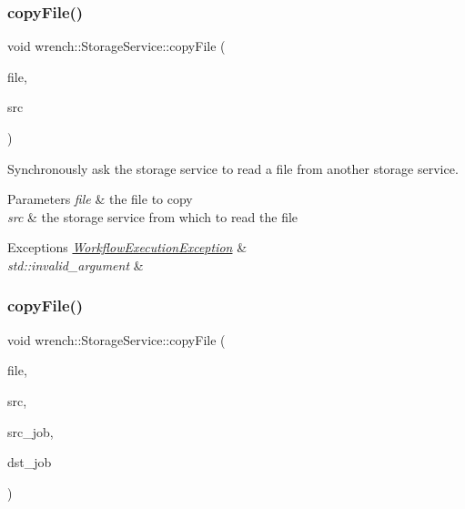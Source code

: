\subsubsection{\texorpdfstring{copy\+File()}{copyFile()}\hspace{0.1cm}{\footnotesize\ttfamily [2/3]}}
{\footnotesize\ttfamily void wrench\+::\+Storage\+Service\+::copy\+File (\begin{DoxyParamCaption}\item[{\hyperlink{classwrench_1_1_workflow_file}{Workflow\+File} $\ast$}]{file,  }\item[{\hyperlink{classwrench_1_1_storage_service}{Storage\+Service} $\ast$}]{src }\end{DoxyParamCaption})\hspace{0.3cm}{\ttfamily [virtual]}}



Synchronously ask the storage service to read a file from another storage service. 


\begin{DoxyParams}{Parameters}
{\em file} & the file to copy \\
\hline
{\em src} & the storage service from which to read the file \\
\hline
\end{DoxyParams}

\begin{DoxyExceptions}{Exceptions}
{\em \hyperlink{classwrench_1_1_workflow_execution_exception}{Workflow\+Execution\+Exception}} & \\
\hline
{\em std\+::invalid\+\_\+argument} & \\
\hline
\end{DoxyExceptions}
\mbox{\label{classwrench_1_1_storage_service_a074c6ae7e32c7c47c4da1cc14cebe654}} 
\subsubsection{\texorpdfstring{copy\+File()}{copyFile()}\hspace{0.1cm}{\footnotesize\ttfamily [3/3]}}
{\footnotesize\ttfamily void wrench\+::\+Storage\+Service\+::copy\+File (\begin{DoxyParamCaption}\item[{\hyperlink{classwrench_1_1_workflow_file}{Workflow\+File} $\ast$}]{file,  }\item[{\hyperlink{classwrench_1_1_storage_service}{Storage\+Service} $\ast$}]{src,  }\item[{\hyperlink{classwrench_1_1_workflow_job}{Workflow\+Job} $\ast$}]{src\+\_\+job,  }\item[{\hyperlink{classwrench_1_1_workflow_job}{Workflow\+Job} $\ast$}]{dst\+\_\+job }\end{DoxyParamCaption})\hspace{0.3cm}{\ttfamily [virtual]}}



